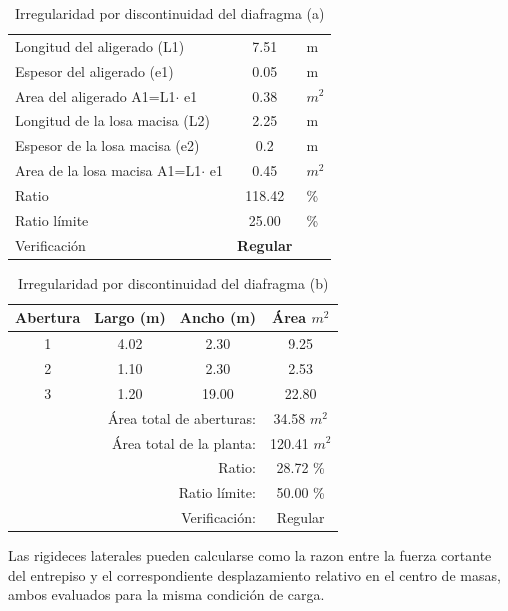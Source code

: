 \documentclass{article}%
\begin{document}
%


\begin{table}[H]%
\centering%
\caption{Irregularidad por discontinuidad del diafragma (a)}%
\begin{tabular}{|ll|c|r}%
\cline{1-3}%
\multicolumn{2}{|l|}{Longitud del aligerado (L1)} & 7.51 & \multicolumn{1}{l}{m} \\%
\cline{1-3}%
\multicolumn{2}{|l|}{Espesor del aligerado (e1)} & 0.05 & \multicolumn{1}{l}{m} \\%
\cline{1-3}%
\multicolumn{2}{|l|}{Area del aligerado A1=L1$\cdot$ e1} & 0.38 & \multicolumn{1}{l}{$m^2$} \\%
\cline{1-3}%
\multicolumn{2}{|l|}{Longitud de la losa macisa (L2)} & 2.25 & \multicolumn{1}{l}{m} \\%
\cline{1-3}%
\multicolumn{2}{|l|}{Espesor de la losa macisa (e2)} & 0.2 & \multicolumn{1}{l}{m} \\%
\cline{1-3}%
\multicolumn{2}{|l|}{Area de la losa macisa A1=L1$\cdot$ e1} & 0.45 & \multicolumn{1}{l}{$m^2$} \\%
\cline{1-3}%
\multicolumn{2}{|l|}{Ratio} & 118.42 & \multicolumn{1}{l}{\%} \\%
\cline{1-3}%
\multicolumn{2}{|l|}{Ratio límite} & 25.00 & \multicolumn{1}{l}{\%} \\%
\cline{1-3}%
\multicolumn{2}{|l|}{Verificación} & \textcolor[rgb]{ .267,  .447,  .769}{\textbf{Regular}} & \multicolumn{1}{l}{} \\%
\cline{1-3}%
\end{tabular}%
\end{table}

%


\begin{table}[H]%
\centering%
\caption{Irregularidad por discontinuidad del diafragma (b)}%
\begin{tabular}{cccc}%
\hline%
\textbf{Abertura}&\textbf{Largo (m)}&\textbf{Ancho (m)}&\textbf{Área $m^2$}\\%
\hline%
1&4.02&2.30&9.25\\%
\hline%
2&1.10&2.30&2.53\\%
\hline%
3&1.20&19.00&22.80\\%
\hline%
&\multicolumn{2}{r}{Área total de aberturas:}&34.58 $m^2$\\%
&\multicolumn{2}{r}{Área total de la planta:}&120.41 $m^2$\\%
&\multicolumn{2}{r}{Ratio:}&28.72 \%\\%
&\multicolumn{2}{r}{Ratio límite:}&50.00 \%\\%
&\multicolumn{2}{r}{Verificación:}&\textcolor[rgb]{ .267,  .447,  .769} {Regular}\\%
\end{tabular}%
\end{table}

%
Las rigideces laterales pueden calcularse como la razon entre la fuerza cortante del entrepiso y el correspondiente desplazamiento relativo en el centro de masas, ambos evaluados para la misma condición de carga. \newline%
%
\end{document}
